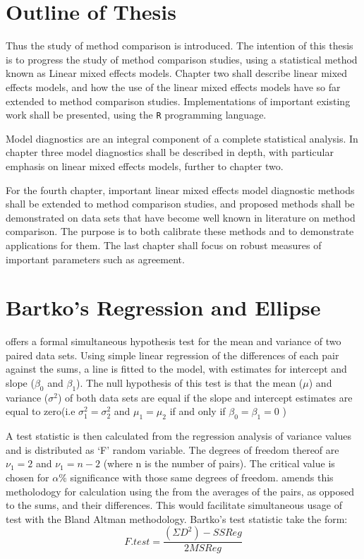\documentclass[12pt, a4paper]{report}
\theoremstyle{plain}
\theoremstyle{definition}
\theoremstyle{remark}
\begin{document}
		\newpage
		\section{Outline of Thesis}
		Thus the study of method comparison is introduced. The intention of this thesis is to progress the
		study of method comparison studies, using a statistical method known as Linear mixed effects models.
		Chapter two shall describe linear mixed effects models, and how the use of the linear mixed
		effects models have so far extended to method comparison studies. Implementations of important existing work shall be presented, using the \texttt{R} programming language.
		
		Model diagnostics are an integral component of a complete statistical analysis.
		In chapter three model diagnostics shall be described in depth, with particular
		emphasis on linear mixed effects models, further to chapter two.
		
		For the fourth chapter, important linear mixed effects model diagnostic methods shall be extended to method comparison studies, and proposed methods shall be demonstrated on data sets that have become well known in literature on method comparison. The purpose is to both calibrate these methods and to demonstrate applications for them.
		The last chapter shall focus on robust measures of important parameters such as agreement.
		
	\section{Bartko's Regression and Ellipse}
	\citet{BB89} offers a formal simultaneous hypothesis test for the
	mean and variance of two paired data sets. Using simple linear
	regression of the differences of each pair against the sums, a
	line is fitted to the model, with estimates for intercept and
	slope ($\beta_{0}$ and $\beta_{1}$). The null hypothesis of this
	test is that the mean ($\mu$) and variance ($\sigma^{2}$) of both
	data sets are equal if the slope and intercept estimates are equal
	to zero(i.e $\sigma^{2}_{1} = \sigma^{2}_{2}$ and
	$\mu_{1}=\mu_{2}$ if and only if $\beta_{0}= \beta_{1}=0$ )
	
	A test statistic is then calculated from the regression analysis
	of variance values \citep{BB89} and is distributed as `F' random
	variable. The degrees of freedom thereof are $\nu_{1}=2$ and
	$\nu_{1}=n-2$ (where n is the number of pairs). The critical value
	is chosen for $\alpha\%$ significance with those same degrees of
	freedom. \citet{Bartko} amends this metholodogy for calculation
	using the from the averages of the pairs, as opposed to the sums,
	and their differences. This would facilitate simultaneous usage of
	test with the Bland Altman methodology. Bartko's test statistic
	take the form:
	\begin{equation} F.test = \frac{(\Sigma D^{2})-SSReg}{2MSReg}
	\end{equation}
	
\end{document}
